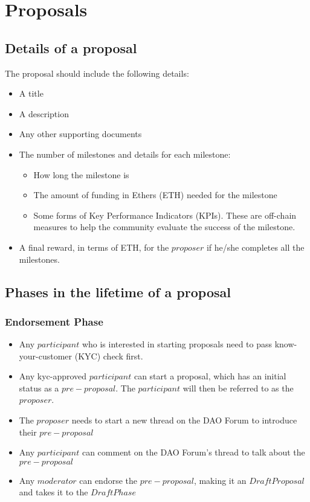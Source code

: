 \documentclass[11pt,a4paper,titlepage]{article}
\begin{document}
\section{Proposals}{
	\subsection{Details of a proposal}{
	The proposal should include the following details:
	\begin{itemize}
		\item A title
		\item A description
		\item Any other supporting documents
		\item The number of milestones and details for each milestone:
		\begin{itemize}
			\item How long the milestone is
			\item The amount of funding in Ethers (ETH) needed for the milestone
			\item Some forms of Key Performance Indicators (KPIs). These are off-chain measures to help the community evaluate the success of the milestone.
		\end{itemize}
		\item A final reward, in terms of ETH, for the $proposer$ if he/she completes all the milestones.
	\end{itemize}
	}
	
	\subsection{Phases in the lifetime of a proposal}{
		\subsubsection{Endorsement Phase}{
			\begin{itemize}
				\item Any $participant$ who is interested in starting proposals need to pass know-your-customer (KYC) check first.
				\item Any kyc-approved $participant$ can start a proposal, which has an initial status as a $pre-proposal$. The $participant$ will then be referred to as the $proposer$.
				\item The $proposer$ needs to start a new thread on the DAO Forum to introduce their $pre-proposal$
				\item Any $participant$ can comment on the DAO Forum's thread to talk about the $pre-proposal$
				\item Any $moderator$ can endorse the $pre-proposal$, making it an $Draft Proposal$ and takes it to the $Draft Phase$
			\end{itemize}
		}
}}
\end{document}
